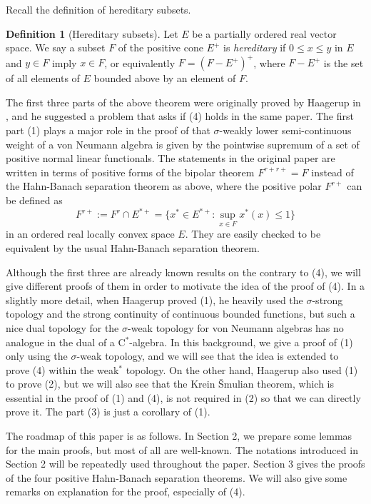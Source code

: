 \documentclass[noamsfonts,a4paper,10pt]{amsart}
\theoremstyle{plain}
\theoremstyle{definition}
\newtheorem{defn}[thm]{Definition}
\theoremstyle{remark}
\begin{document}
Recall the definition of hereditary subsets.

\begin{defn}[Hereditary subsets]
Let $E$ be a partially ordered real vector space.
We say a subset $F$ of the positive cone $E^+$ is \emph{hereditary} if $0\le x\le y$ in $E$ and $y\in F$ imply $x\in F$, or equivalently $F=(F-E^+)^+$, where $F-E^+$ is the set of all elements of $E$ bounded above by an element of $F$.
\end{defn}

The first three parts of the above theorem were originally proved by Haagerup in \cite{MR380438}, and he suggested a problem that asks if (4) holds in the same paper.
The first part (1) plays a major role in the proof of that $\sigma$-weakly lower semi-continuous weight of a von Neumann algebra is given by the pointwise supremum of a set of positive normal linear functionals.
The statements in the original paper are written in terms of positive forms of the bipolar theorem $F^{r+r+}=F$ instead of the Hahn-Banach separation theorem as above, where the positive polar $F^{r+}$ can be defined as
\[F^{r+}:=F^r\cap E^{*+}=\{x^*\in E^{*+}:\sup_{x\in F}x^*(x)\le1\}\]
in an ordered real locally convex space $E$.
They are easily checked to be equivalent by the usual Hahn-Banach separation theorem.

Although the first three are already known results on the contrary to (4), we will give different proofs of them in order to motivate the idea of the proof of (4).
In a slightly more detail, when Haagerup proved (1), he heavily used the $\sigma$-strong topology and the strong continuity of continuous bounded functions, but such a nice dual topology for the $\sigma$-weak topology for von Neumann algebras has no analogue in the dual of a C$^*$-algebra.
In this background, we give a proof of (1) only using the $\sigma$-weak topology, and we will see that the idea is extended to prove (4) within the weak$^*$ topology.
On the other hand, Haagerup also used (1) to prove (2), but we will also see that the Krein \v Smulian theorem, which is essential in the proof of (1) and (4), is not required in (2) so that we can directly prove it.
The part (3) is just a corollary of (1).

The roadmap of this paper is as follows.
In Section 2, we prepare some lemmas for the main proofs, but most of all are well-known.
The notations introduced in Section 2 will be repeatedly used throughout the paper.
Section 3 gives the proofs of the four positive Hahn-Banach separation theorems.
We will also give some remarks on explanation for the proof, especially of (4).
\end{document}
